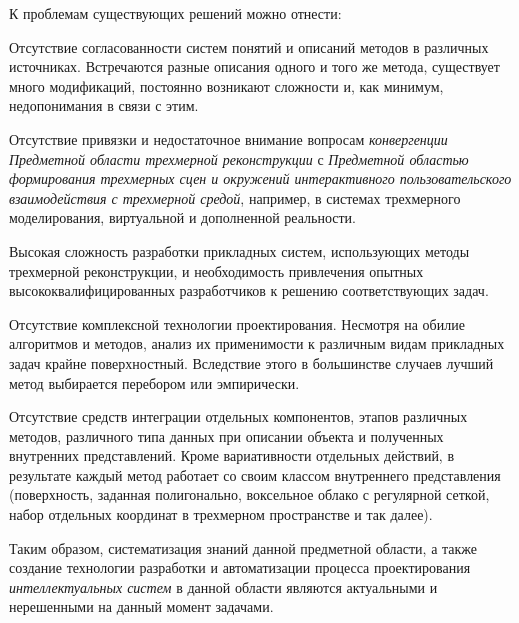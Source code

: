К проблемам существующих решений можно отнести:
\begin{textitemize}
    \item Отсутствие согласованности систем понятий и описаний методов в различных источниках. Встречаются разные описания одного и того же метода, существует много модификаций, постоянно возникают сложности и, как минимум, недопонимания в связи с этим.
    \item Отсутствие привязки и недостаточное внимание вопросам \textit{конвергенции} \textit{Предметной области трехмерной реконструкции} с \textit{Предметной областью формирования трехмерных сцен и окружений интерактивного пользовательского взаимодействия с трехмерной средой}, например, в системах трехмерного моделирования, виртуальной и дополненной реальности.
    \item Высокая сложность разработки прикладных систем, использующих методы трехмерной реконструкции, и необходимость привлечения опытных высококвалифицированных разработчиков к решению соответствующих задач.
    \item Отсутствие комплексной технологии проектирования. Несмотря на обилие алгоритмов и методов, анализ их применимости к различным видам прикладных задач крайне поверхностный. Вследствие этого в большинстве случаев лучший метод выбирается перебором или эмпирически.
    \item Отсутствие средств интеграции отдельных компонентов, этапов различных методов, различного типа данных при описании объекта и полученных внутренних представлений. Кроме вариативности отдельных действий, в результате каждый метод работает со своим классом внутреннего представления (поверхность, заданная полигонально, воксельное облако с регулярной сеткой, набор отдельных координат в трехмерном пространстве и так далее).
\end{textitemize}

Таким образом, систематизация знаний данной предметной области, а также создание технологии разработки и автоматизации процесса проектирования \textit{интеллектуальных систем} в данной области являются актуальными и нерешенными на данный момент задачами.

